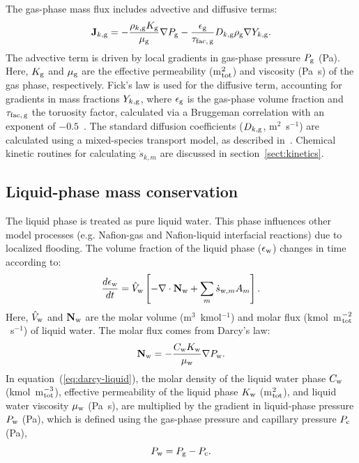 \documentclass[final,3p,times,twocolumn]{elsarticle}    %
\begin{document}
The gas-phase mass flux includes advective and diffusive terms: 
\begin{equation} \label{eq:mass-flux}
    \mathbf{J}_{k,\rm g} = -\frac{\rho_{k,\rm g} K_{\rm g}}{\mu_{\rm g}} \nabla P_{\rm g} 
                  -\frac{\epsilon_{\rm g}}{\tau_{\rm fac,\,g}} D_{k,\rm g} 
                   \rho_{\rm g} \nabla Y_{k,\rm g}.
\end{equation}
The advective term is driven by local gradients in gas-phase pressure $P_{\rm g}$ (Pa). Here, $K_{\rm g}$ and $\mu_{\rm g}$ are the effective permeability (m$^2_{\rm tot}$) and viscosity (Pa~s) of the gas phase, respectively. Fick's law is used for the diffusive term, accounting for gradients in mass fractions $Y_{k,\rm g}$, where $\epsilon_{\rm g}$ is the gas-phase volume fraction and $\tau_{\rm fac,\,g}$ the toruosity factor, calculated via a Bruggeman correlation with an exponent of $-0.5$~\cite{bib:bruggeman_1935}. The standard diffusion coefficients ($D_{k,\rm g}$, m$^2$~s$^{-1}$) are calculated using a mixed-species transport model, as described in~\cite{bib:kee_2018}. Chemical kinetic routines for calculating $\dot{s}_{k,m}$ are discussed in section~\ref{sect:kinetics}.

\subsection{Liquid-phase mass conservation}
The liquid phase is treated as pure liquid water. This phase influences other model processes (e.g. Nafion-gas and Nafion-liquid interfacial reactions) due to localized flooding. The volume fraction of the liquid phase ($\epsilon_{\rm w}$) changes in time according to:
\begin{equation}\label{eq:volfrac_w}
    \frac{d \epsilon_{\rm w}}{d t} = \hat{V}_{\rm w} \left[ 
    - \nabla \cdot {\bf N}_{\rm w} + \sum_m \dot{s}_{{\rm w},m} A_m \right].
\end{equation}
Here, $\hat{V}_{\rm w}$ and ${\bf N}_{\rm w}$ are the molar volume (m$^3$~kmol$^{-1}$) and molar flux (kmol~m$^{-2}_{\rm tot}$~s$^{-1}$) of liquid water. The molar flux comes from Darcy's law:
\begin{equation} \label{eq:darcy-liquid}
    {\bf N}_{\rm w} = -\frac{C_{\rm w} K_{\rm w}}{\mu_{\rm w}} \nabla P_{\rm w}.
\end{equation}
In equation~(\ref{eq:darcy-liquid}), the molar density of the liquid water phase $C_{\rm w}$ (kmol~m$^{-3}_{\rm tot}$), effective permeability of the liquid phase $K_{\rm w}$ (m$^{2}_{\rm tot}$), and liquid water viscosity $\mu_{\rm w}$ (Pa~s), are multiplied by the gradient in liquid-phase pressure $P_{\rm w}$ (Pa), which is defined using the gas-phase pressure and capillary pressure $P_{\rm c}$ (Pa),
\begin{equation}
    P_{\rm w} = P_{\rm g} - P_{\rm c}.
\end{equation}
\end{document}
